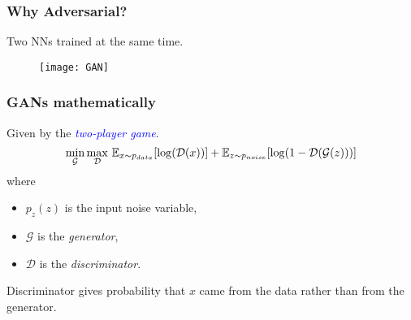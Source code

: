 \documentclass[aspectratio=149]{beamer}
\newcommand{\G}{\mathcal{G}}
\renewcommand{\D}{\mathcal{D}}
\begin{document}
\begin{frame}
  \frametitle{Why Adversarial?}
  Two NNs trained at the same time.
  \begin{figure}[ht]
    \centering
    \texttt{[image: GAN]}
  \end{figure}
\end{frame}


\begin{frame}
  \frametitle{GANs mathematically}
  Given by the \textcolor{blue}{\emph{two-player game}}.
  \begin{equation}
    \min_{\G} \max_{\D} \, \E_{x\sim p_{data}} [\log(\D(x))] + \E_{z\sim p_{noise}}
    [\log(1- \D(\G(z)))]
  \end{equation}
  where
  \begin{itemize}
    \item $p_{z}(z)$ is the input noise variable,
    \item $\G$ is the \emph{generator},
    \item $\D$ is the \emph{discriminator}.
  \end{itemize}
  \begin{block}{}
    Discriminator gives probability that $x$ came from the data rather than
    from the generator.
  \end{block}
\end{frame}
\end{document}
